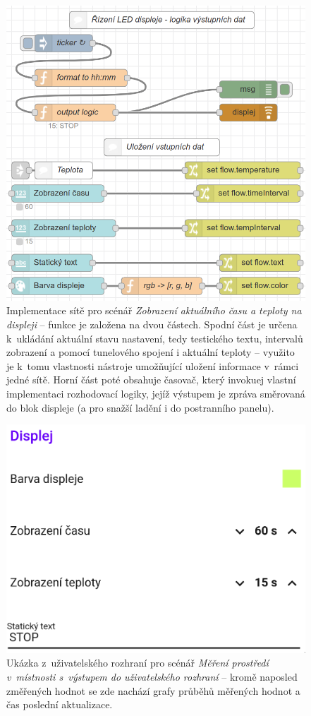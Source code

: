 \begin{figure}
    \centering
    \includegraphics[width=.7\textwidth]{figures/fis-flow-2.png}
    \caption{Implementace sítě pro scénář \textit{Zobrazení aktuálního času a teploty na displeji} -- funkce je
    založena na dvou částech.
    Spodní část je určena k~ukládání aktuální stavu nastavení, tedy testického textu, intervalů zobrazení a pomocí
    tunelového spojení i aktuální teploty -- využito je k~tomu vlastnosti nástroje umožňující uložení informace
v~rámci jedné sítě.
    Horní část poté obsahuje časovač, který invokuej vlastní implementaci rozhodovací logiky, jejíž výstupem je
    zpráva směrovaná do blok displeje (a pro snažší ladění i do postranního panelu).}
    \label{fig:node-red-production-2}
\end{figure}
\begin{figure}
    \centering
    \includegraphics[width=.5\textwidth]{figures/fis-flow-2-ui.png}
    \caption{Ukázka z~uživatelského rozhraní pro scénář \textit{Měření prostředí v~místnosti s~výstupem do
    uživatelského rozhraní} -- kromě naposled změřených hodnot se zde nachází grafy průběhů měřených hodnot a čas
    poslední aktualizace.}
    \label{fig:node-red-production-2-ui}
\end{figure}

